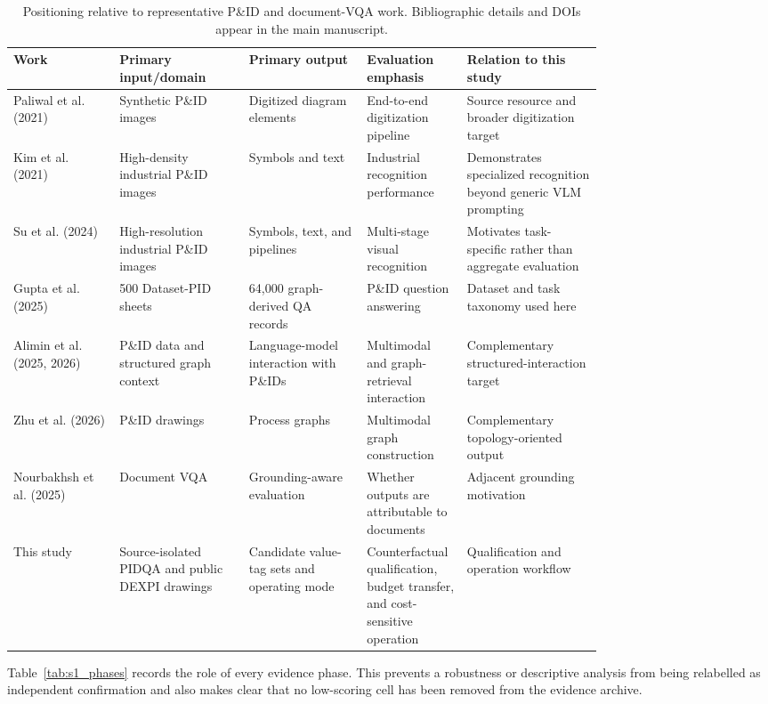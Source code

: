 \documentclass[11pt]{article}
\begin{document}
\begin{table}[H]
\centering
\caption{Positioning relative to representative P\&ID and document-VQA work.
Bibliographic details and DOIs appear in the main manuscript.}
\label{tab:s1_position}
\scriptsize
\setlength{\tabcolsep}{3pt}
\begin{tabularx}{\linewidth}{P{0.18\linewidth}P{0.22\linewidth}P{0.20\linewidth}P{0.17\linewidth}Y}
\toprule
Work & Primary input/domain & Primary output & Evaluation emphasis & Relation to this study \\
\midrule
Paliwal et al. (2021) & Synthetic P\&ID images & Digitized diagram elements & End-to-end digitization pipeline & Source resource and broader digitization target \\
Kim et al. (2021) & High-density industrial P\&ID images & Symbols and text & Industrial recognition performance & Demonstrates specialized recognition beyond generic VLM prompting \\
Su et al. (2024) & High-resolution industrial P\&ID images & Symbols, text, and pipelines & Multi-stage visual recognition & Motivates task-specific rather than aggregate evaluation \\
Gupta et al. (2025) & 500 Dataset-PID sheets & 64,000 graph-derived QA records & P\&ID question answering & Dataset and task taxonomy used here \\
Alimin et al. (2025, 2026) & P\&ID data and structured graph context & Language-model interaction with P\&IDs & Multimodal and graph-retrieval interaction & Complementary structured-interaction target \\
Zhu et al. (2026) & P\&ID drawings & Process graphs & Multimodal graph construction & Complementary topology-oriented output \\
Nourbakhsh et al. (2025) & Document VQA & Grounding-aware evaluation & Whether outputs are attributable to documents & Adjacent grounding motivation \\
This study & Source-isolated PIDQA and public DEXPI drawings & Candidate value-tag sets and operating mode & Counterfactual qualification, budget transfer, and cost-sensitive operation & Qualification and operation workflow \\
\bottomrule
\end{tabularx}
\end{table}

Table~\ref{tab:s1_phases} records the role of every evidence phase. This prevents a robustness
or descriptive analysis from being relabelled as independent confirmation and
also makes clear that no low-scoring cell has been removed from the evidence
archive.
\end{document}
